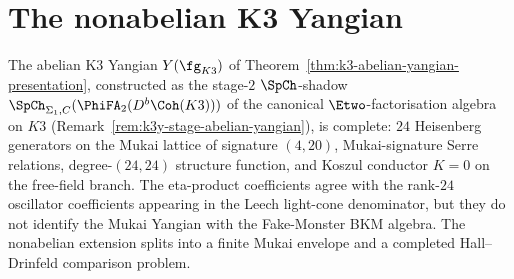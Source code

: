 \section{The nonabelian K3 Yangian}
\label{sec:nonabelian-k3-yangian-programme}

The abelian K3 Yangian $Y(\fg_{K3})$ of Theorem~\ref{thm:k3-abelian-yangian-presentation}, constructed as the stage-$2$ $\SpCh$-shadow $\SpCh_{\Sigma_1, C}(\PhiFA_2(D^b\Coh(K3)))$ of the canonical $\Etwo$-factorisation algebra on $K3$ (Remark~\ref{rem:k3y-stage-abelian-yangian}), is complete: $24$ Heisenberg generators on the Mukai lattice of signature $(4, 20)$, Mukai-signature Serre relations, degree-$(24,24)$ structure function, and Koszul conductor $K = 0$ on the free-field branch. The eta-product coefficients agree with the rank-$24$ oscillator coefficients appearing in the Leech light-cone denominator, but they do not identify the Mukai Yangian with the Fake-Monster BKM algebra. The nonabelian extension splits into a finite Mukai envelope and a completed Hall--Drinfeld comparison problem.

